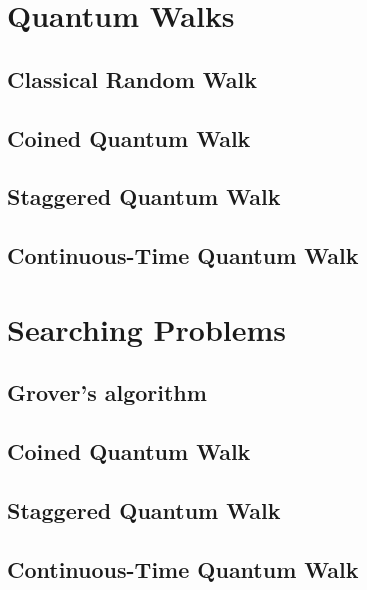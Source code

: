 \documentclass[
oneside,
11pt, a4paper,
footinclude=true,
headinclude=true,
cleardoublepage=empty
]{scrbook}
\begin{document}
\chapter{Quantum Walks}\label{chap:QuantumWalks}

\section{Classical Random Walk}\label{sec:chap3ClassicalWalk}

\section{Coined Quantum Walk}\label{sec:chap3Coinedwalk}

\section{Staggered Quantum Walk}\label{sec:chap3StagWalk}

\section{Continuous-Time Quantum Walk}\label{sec:chap3Contwalk}



\chapter{Searching Problems}\label{chap:searchingProblems}

\section{Grover's algorithm}\label{sec:GrovSearchSimul}

\section{Coined Quantum Walk}\label{sec:CoinedSearchSimul}

\section{Staggered Quantum Walk}\label{sec:StagSearchSimul}

\section{Continuous-Time Quantum Walk}\label{sec:ContSearchSimul}

\end{document}
